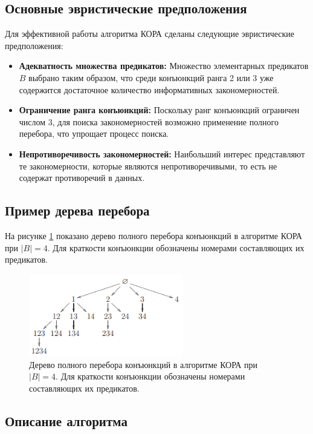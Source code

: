 \subsection{Основные эвристические предположения}

Для эффективной работы алгоритма КОРА сделаны следующие эвристические предположения:

\begin{itemize}
    \item \textbf{Адекватность множества предикатов:} Множество элементарных предикатов \(B\) выбрано таким образом, что среди конъюнкций ранга 2 или 3 уже содержится достаточное количество информативных закономерностей.
    \item \textbf{Ограничение ранга конъюнкций:} Поскольку ранг конъюнкций ограничен числом 3, для поиска закономерностей возможно применение полного перебора, что упрощает процесс поиска.
    \item \textbf{Непротиворечивость закономерностей:} Наибольший интерес представляют те закономерности, которые являются непротиворечивыми, то есть не содержат противоречий в данных.
\end{itemize}

\subsection{Пример дерева перебора}

На рисунке \ref{fig:kora_tree} показано дерево полного перебора конъюнкций в алгоритме КОРА при \(|B| = 4\). Для краткости конъюнкции обозначены номерами составляющих их предикатов.

\begin{figure}[h]
    \centering
    \includegraphics[width=0.6\textwidth]{chapters/logical/images/kora_tree.png}
    \caption{Дерево полного перебора конъюнкций в алгоритме КОРА при \(|B| = 4\). Для краткости конъюнкции обозначены номерами составляющих их предикатов.}
    \label{fig:kora_tree}
\end{figure}

\subsection{Описание алгоритма}

